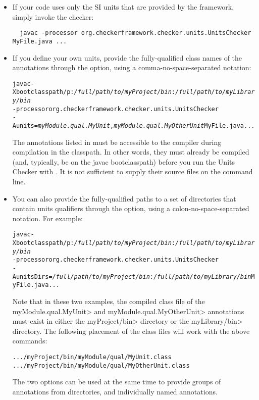 \begin{itemize}
\item
If your code uses only the SI units that are provided by the
framework, simply invoke the checker:

\begin{Verbatim}
  javac -processor org.checkerframework.checker.units.UnitsChecker MyFile.java ...
\end{Verbatim}

\item
If you define your own units, provide the fully-qualified class names of the
annotations through the  option, using a comma-no-space-separated
notation:

\begin{alltt}
  javac -Xbootclasspath/p:\textit{/full/path/to/myProject/bin}:\textit{/full/path/to/myLibrary/bin} \ttbs
        -processor org.checkerframework.checker.units.UnitsChecker \ttbs
        -Aunits=\textit{myModule.qual.MyUnit},\textit{myModule.qual.MyOtherUnit} MyFile.java ...
\end{alltt}

The annotations listed in  must be accessible to
the compiler during compilation in the classpath.  In other words, they must
already be compiled (and, typically, be on the javac bootclasspath)
before you run the Units Checker with .  It
is not sufficient to supply their source files on the command line.

\item
You can also provide the fully-qualified paths to a set of directories
that contain units qualifiers through the  option,
using a colon-no-space-separated notation. For example:

\begin{alltt}
  javac -Xbootclasspath/p:\textit{/full/path/to/myProject/bin}:\textit{/full/path/to/myLibrary/bin} \ttbs
        -processor org.checkerframework.checker.units.UnitsChecker \ttbs
        -AunitsDirs=\textit{/full/path/to/myProject/bin}:\textit{/full/path/to/myLibrary/bin} MyFile.java ...
\end{alltt}

Note that in these two examples, the compiled class file of the
\<myModule.qual.MyUnit> and \<myModule.qual.MyOtherUnit> annotations
must exist in either the \<myProject/bin> directory or the
\<myLibrary/bin> directory. The following placement of the class files
will work with the above commands:

\begin{alltt}
  .../myProject/bin/myModule/qual/MyUnit.class
  .../myProject/bin/myModule/qual/MyOtherUnit.class
\end{alltt}

The two options can be used at the same time to provide groups of annotations
from directories, and individually named annotations.

\end{itemize}

